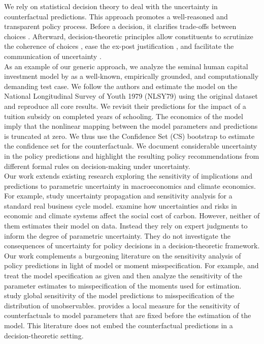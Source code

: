 {\noindent We rely on statistical decision theory \cite{Manski.2013} to deal with the uncertainty in counterfactual predictions. This approach promotes a well-reasoned and transparent policy process. Before a decision, it clarifies trade-offs between choices \cite{Gilboa.2018}. Afterward, decision-theoretic principles allow constituents to scrutinize the coherence of choices \cite{Gilboa.2020}, ease the ex-post justification \cite{Berger.2021}, and facilitate the communication of uncertainty \cite{Manski.2019}.\\

\noindent As an example of our generic approach, we analyze the seminal human capital investment model by  \cite{Keane.1997} as a well-known, empirically grounded, and computationally demanding test case. We follow the authors and estimate the model on the National Longitudinal Survey of Youth 1979 (NLSY79) \cite{NLSY.2019} using the original dataset and reproduce all core results. We revisit their predictions for the impact of a tuition subsidy on completed years of schooling. The economics of the model imply that the nonlinear mapping between the model parameters and predictions is truncated at zero. We thus use the Confidence Set (CS) bootstrap \cite{Woutersen.2019} to estimate the confidence set for the counterfactuals. We document considerable uncertainty in the policy predictions and highlight the resulting policy recommendations from different formal rules on decision-making under uncertainty. \\

\noindent Our work extends existing research exploring the sensitivity of implications and predictions to parametric uncertainty in macroeconomics and climate economics. For example, \cite{Harenberg.2019} study uncertainty propagation and sensitivity analysis for a standard real business cycle model. \cite{Cai.2019} examine how uncertainties and risks in economic and climate systems affect the social cost of carbon. However, neither of them estimates their model on data. Instead they rely on expert judgments to inform the degree of parametric uncertainty. They do not investigate the consequences of uncertainty for policy decisions in a decision-theoretic framework.\\

\noindent Our work complements a burgeoning literature on the sensitivity analysis of policy predictions in light of model or moment misspecification. For example, \cite{Andrews.2017} and \cite{Andrews.2020} treat the model specification as given and then analyze the sensitivity of the parameter estimates to misspecification of the moments used for estimation. \cite{Christensen.2019} study global sensitivity of the model predictions to misspecification of the distribution of unobservables. \cite{Jorgensen.2021} provides a local measure for the sensitivity of counterfactuals to model parameters that are fixed before the estimation of the model. This literature does not embed the counterfactual predictions in a decision-theoretic setting.\\



}
